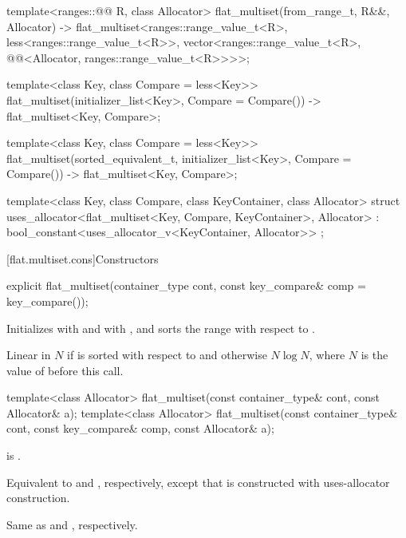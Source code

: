\begin{codeblock}
{  template<ranges::@@ R, class Allocator>
    flat_multiset(from_range_t, R&&, Allocator)
      -> flat_multiset<ranges::range_value_t<R>, less<ranges::range_value_t<R>>,
                       vector<ranges::range_value_t<R>,
                              @@<Allocator, ranges::range_value_t<R>>>>;

  template<class Key, class Compare = less<Key>>
    flat_multiset(initializer_list<Key>, Compare = Compare())
      -> flat_multiset<Key, Compare>;

  template<class Key, class Compare = less<Key>>
  flat_multiset(sorted_equivalent_t, initializer_list<Key>, Compare = Compare())
      -> flat_multiset<Key, Compare>;

  template<class Key, class Compare, class KeyContainer, class Allocator>
    struct uses_allocator<flat_multiset<Key, Compare, KeyContainer>, Allocator>
      : bool_constant<uses_allocator_v<KeyContainer, Allocator>> { };
}
\end{codeblock}

[flat.multiset.cons]{Constructors}

%
\begin{itemdecl}
explicit flat_multiset(container_type cont, const key_compare& comp = key_compare());
\end{itemdecl}

\begin{itemdescr}
\pnum
\effects
Initializes  with  and
 with , and
sorts the range  with respect to .

\pnum
\complexity
Linear in $N$ if  is sorted with respect to  and
otherwise $N \log N$, where $N$ is the value of  before this call.
\end{itemdescr}

%
\begin{itemdecl}
template<class Allocator>
  flat_multiset(const container_type& cont, const Allocator& a);
template<class Allocator>
  flat_multiset(const container_type& cont, const key_compare& comp, const Allocator& a);
\end{itemdecl}

\begin{itemdescr}
\pnum
\constraints
{} is .

\pnum
\effects
Equivalent to  and
, respectively,
except that  is constructed with
uses-allocator construction.

\pnum
\complexity
Same as  and
, respectively.
\end{itemdescr}

